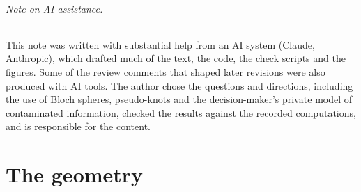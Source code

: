 \documentclass[11pt]{article}
\theoremstyle{definition}\newtheorem{definition}[theorem]{Definition}\newtheorem{remark}[theorem]{Remark}\newtheorem{example}[theorem]{Example}\newtheorem{problem}[theorem]{Open problem}\crefname{problem}{Problem}{Problems}
\begin{document}
\begin{abstract}
decision while every compatibility test passes: compatibility does not imply honesty.

Section~1 states the status of every claim (proved, cited, computed or open), and a ledger of check scripts records every computation.
\end{abstract}

\paragraph{Note on AI assistance.} This note was written with substantial help from an AI system (Claude, Anthropic), which drafted much of the text, the code, the check scripts and the figures. Some of the review comments that shaped later revisions were also produced with AI tools. The author chose the questions and directions, including the use of Bloch spheres, pseudo-knots and the decision-maker's private model of contaminated information, checked the results against the recorded computations, and is responsible for the content.

\part{The geometry}
\end{document}
